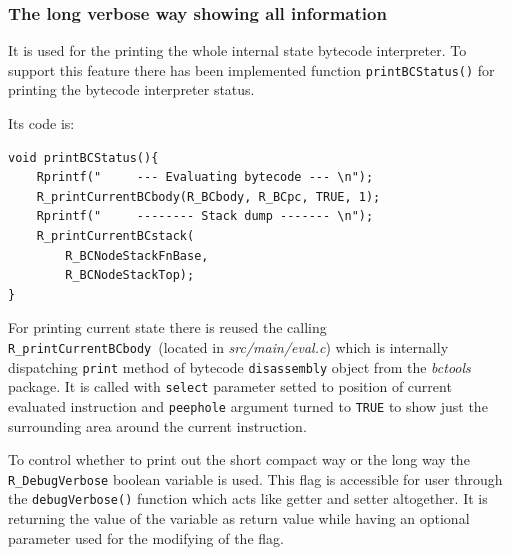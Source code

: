 \documentclass[thesis=M,english]{FITthesis}[2018/10/20]
\newcommand{\code}[1]{\texttt{#1}}
\begin{document}
\subsubsection{The long verbose way showing all information}\label{long-verbose-way}
It is used for the printing the whole internal state bytecode interpreter. To support this feature there has been implemented function \code{printBCStatus()} for printing the bytecode interpreter status.

Its code is:
\begin{lstlisting}
void printBCStatus(){
    Rprintf("     --- Evaluating bytecode --- \n");
    R_printCurrentBCbody(R_BCbody, R_BCpc, TRUE, 1);
    Rprintf("     -------- Stack dump ------- \n");
    R_printCurrentBCstack(
    	R_BCNodeStackFnBase,
    	R_BCNodeStackTop);
}
\end{lstlisting}

For printing current state there is reused the calling \code{R{\_}printCurrentBCbody}~(located in \textit{src/main/eval.c}) which is internally dispatching \code{print} method of bytecode \code{disassembly} object from the \textit{bctools} package. It is called with \code{select} parameter setted to position of current evaluated instruction and \code{peephole} argument turned to \code{TRUE} to show just the surrounding area around the current instruction.

To control whether to print out the short compact way or the long way the \code{R{\_}DebugVerbose} boolean variable is used. This flag is accessible for user through the \code{debugVerbose()} function which acts like getter and setter altogether. It is returning the value of the variable as return value while having an optional parameter used for the modifying of the flag.
\end{document}
